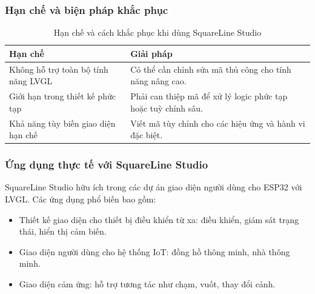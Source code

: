 \subsubsection{Hạn chế và biện pháp khắc phục}
\begin{table}[H]
\centering
\begin{tabular}{|p{5.5cm}|p{8.5cm}|}
\hline
\textbf{Hạn chế} & \textbf{Giải pháp} \\
\hline
Không hỗ trợ toàn bộ tính năng LVGL & Có thể cần chỉnh sửa mã thủ công cho tính năng nâng cao. \\
\hline
Giới hạn trong thiết kế phức tạp & Phải can thiệp mã để xử lý logic phức tạp hoặc tuỳ chỉnh sâu. \\
\hline
Khả năng tùy biến giao diện hạn chế & Viết mã tùy chỉnh cho các hiệu ứng và hành vi đặc biệt. \\
\hline
\end{tabular}
\caption{Hạn chế và cách khắc phục khi dùng SquareLine Studio}
\end{table}

\subsubsection{Ứng dụng thực tế với SquareLine Studio}
SquareLine Studio hữu ích trong các dự án giao diện người dùng cho ESP32 với LVGL. Các ứng dụng phổ biến bao gồm:
\begin{itemize}
  \item Thiết kế giao diện cho thiết bị điều khiển từ xa: điều khiển, giám sát trạng thái, hiển thị cảm biến.
  \item Giao diện người dùng cho hệ thống IoT: đồng hồ thông minh, nhà thông minh.
  \item Giao diện cảm ứng: hỗ trợ tương tác như chạm, vuốt, thay đổi cảnh.
\end{itemize}
